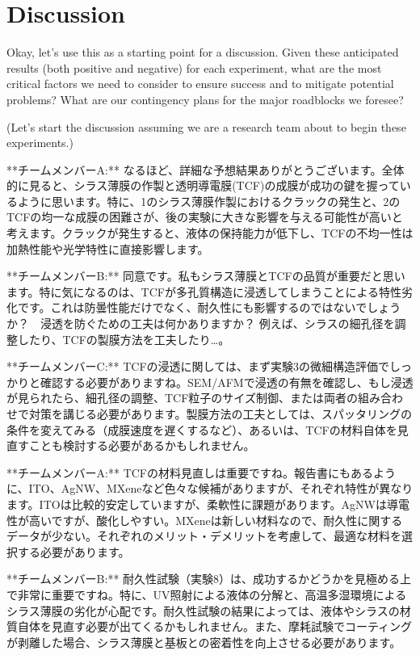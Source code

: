 \documentclass{article}
\begin{document}
\section{Discussion}
Okay, let's use this as a starting point for a discussion. Given these anticipated results (both positive and negative) for each experiment, what are the most critical factors we need to consider to ensure success and to mitigate potential problems? What are our contingency plans for the major roadblocks we foresee?

(Let's start the discussion assuming we are a research team about to begin these experiments.)

**チームメンバーA:**  なるほど、詳細な予想結果ありがとうございます。全体的に見ると、シラス薄膜の作製と透明導電膜(TCF)の成膜が成功の鍵を握っているように思います。特に、1のシラス薄膜作製におけるクラックの発生と、2のTCFの均一な成膜の困難さが、後の実験に大きな影響を与える可能性が高いと考えます。クラックが発生すると、液体の保持能力が低下し、TCFの不均一性は加熱性能や光学特性に直接影響します。

**チームメンバーB:**  同意です。私もシラス薄膜とTCFの品質が重要だと思います。特に気になるのは、TCFが多孔質構造に浸透してしまうことによる特性劣化です。これは防曇性能だけでなく、耐久性にも影響するのではないでしょうか？　浸透を防ぐための工夫は何かありますか？ 例えば、シラスの細孔径を調整したり、TCFの製膜方法を工夫したり…。

**チームメンバーC:**  TCFの浸透に関しては、まず実験3の微細構造評価でしっかりと確認する必要がありますね。SEM/AFMで浸透の有無を確認し、もし浸透が見られたら、細孔径の調整、TCF粒子のサイズ制御、または両者の組み合わせで対策を講じる必要があります。製膜方法の工夫としては、スパッタリングの条件を変えてみる（成膜速度を遅くするなど）、あるいは、TCFの材料自体を見直すことも検討する必要があるかもしれません。

**チームメンバーA:**  TCFの材料見直しは重要ですね。報告書にもあるように、ITO、AgNW、MXeneなど色々な候補がありますが、それぞれ特性が異なります。ITOは比較的安定していますが、柔軟性に課題があります。AgNWは導電性が高いですが、酸化しやすい。MXeneは新しい材料なので、耐久性に関するデータが少ない。それぞれのメリット・デメリットを考慮して、最適な材料を選択する必要があります。

**チームメンバーB:**  耐久性試験（実験8）は、成功するかどうかを見極める上で非常に重要ですね。特に、UV照射による液体の分解と、高温多湿環境によるシラス薄膜の劣化が心配です。耐久性試験の結果によっては、液体やシラスの材質自体を見直す必要が出てくるかもしれません。また、摩耗試験でコーティングが剥離した場合、シラス薄膜と基板との密着性を向上させる必要があります。
\end{document}
